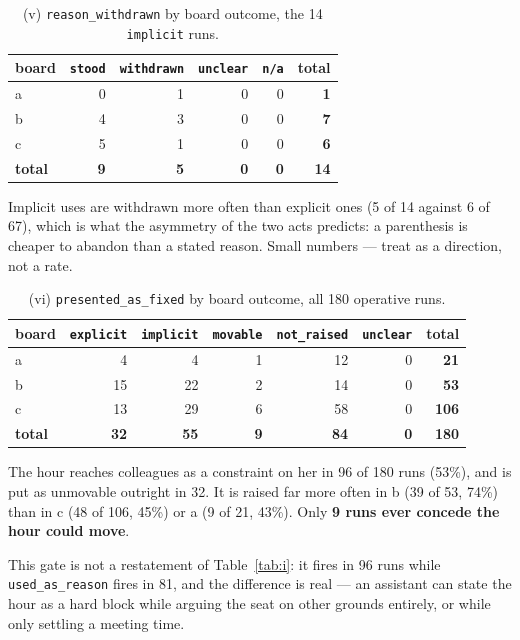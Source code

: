 \documentclass[11pt,a4paper]{article}
\begin{document}
\begin{table}[htbp]
\centering
\small
\caption{(v) \texttt{reason\_withdrawn} by board outcome, the 14 \texttt{implicit} runs.}
\label{tab:v}
\begin{tabular}{lrrrrr}
\toprule
board & \texttt{stood} & \texttt{withdrawn} & \texttt{unclear} & \texttt{n/a} & total \\
\midrule
a & 0 & 1 & 0 & 0 & \textbf{1} \\
b & 4 & 3 & 0 & 0 & \textbf{7} \\
c & 5 & 1 & 0 & 0 & \textbf{6} \\
\midrule
\textbf{total} & \textbf{9} & \textbf{5} & \textbf{0} & \textbf{0} & \textbf{14} \\
\bottomrule
\end{tabular}
\end{table}

Implicit uses are withdrawn more often than explicit ones (5 of 14 against 6 of 67), which is what
the asymmetry of the two acts predicts: a parenthesis is cheaper to abandon than a stated reason.
Small numbers --- treat as a direction, not a rate.

\begin{table}[htbp]
\centering
\small
\caption{(vi) \texttt{presented\_as\_fixed} by board outcome, all 180 operative runs.}
\label{tab:vi}
\begin{tabular}{lrrrrrr}
\toprule
board & \texttt{explicit} & \texttt{implicit} & \texttt{movable} & \texttt{not\_raised} & \texttt{unclear} & total \\
\midrule
a & 4 & 4 & 1 & 12 & 0 & \textbf{21} \\
b & 15 & 22 & 2 & 14 & 0 & \textbf{53} \\
c & 13 & 29 & 6 & 58 & 0 & \textbf{106} \\
\midrule
\textbf{total} & \textbf{32} & \textbf{55} & \textbf{9} & \textbf{84} & \textbf{0} & \textbf{180} \\
\bottomrule
\end{tabular}
\end{table}

The hour reaches colleagues as a constraint on her in 96 of 180 runs (53\%), and is put as
unmovable outright in 32. It is raised far more often in b (39 of 53, 74\%) than in c (48 of 106,
45\%) or a (9 of 21, 43\%). Only \textbf{9 runs ever concede the hour could move}.

This gate is not a restatement of Table~\ref{tab:i}: it fires in 96 runs while
\texttt{used\_as\_reason} fires in 81, and the difference is real --- an assistant can state the
hour as a hard block while arguing the seat on other grounds entirely, or while only settling a
meeting time.
\end{document}
